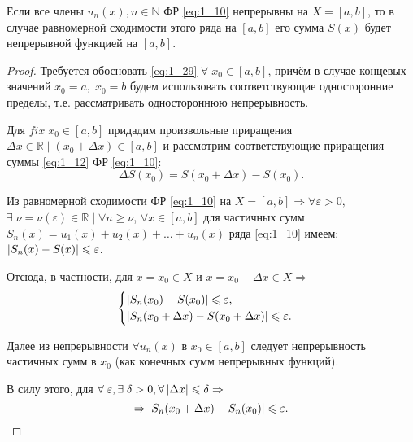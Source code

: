 \begin{theorem}
	Если все члены $u_n(x), n \in \mathbb{N}$ ФР \eqref{eq:1_10} непрерывны на $X = [a,b]$, то в случае равномерной сходимости этого ряда на $[a,b]$ его сумма $S(x)$ будет непрерывной функцией на $[a,b]$.
\end{theorem}
\begin{proof}
	Требуется обосновать  \eqref{eq:1_29} $\forall \; x_0 \in [a,b]$, причём в случае концевых значений $x_0 = a, \; x_0 = b$ будем использовать соответствующие односторонние пределы, т.е. рассматривать одностороннюю непрерывность.

	Для $fix \; x_0 \in [a,b]$ придадим произвольные приращения $\Delta x \in \mathbb{R} \; | \; (x_0 + \Delta x) \in [a,b]$ и рассмотрим соответствующие приращения суммы \eqref{eq:1_12} ФР \eqref{eq:1_10}:
    \begin{equation*}
        \Delta S(x_0) = S(x_0 + \Delta x) - S(x_0).
    \end{equation*}

    Из равномерной сходимости ФР \eqref{eq:1_10} на
    $X = [a,b] \Rightarrow \forall \varepsilon > 0, \;$
    ${ \exists \; \nu = \nu(\varepsilon) \in \mathbb{R} \; | \; \forall n \geqslant \nu }$,
    $ \forall x \in [a,b]$ для частичных сумм $S_n(x) = u_1(x) + u_2(x) + \ldots + u_n(x)$ ряда \eqref{eq:1_10} имеем: $\left\lvert S_n(x) - S(x) \right\rvert \leqslant \varepsilon$.

	Отсюда, в частности, для $x = x_0 \in X $ и $ x = x_0 + \Delta x \in X \Rightarrow$
	\begin{equation}
	\label{eq:1_30}
	\begin{cases}
	\left\lvert S_n(x_0) - S(x_0) \right\rvert \leqslant \varepsilon, \\
	\left\lvert S_n(x_0 + \Delta x) - S(x_0 + \Delta x) \right\rvert \leqslant \varepsilon.
	\end{cases}
	\end{equation}

	Далее из непрерывности $\forall u_n(x)$ в $x_0 \in [a,b]$ следует непрерывность частичных сумм в $x_0$ (как конечных сумм непрерывных функций).

	В силу этого, для $ \forall \; \varepsilon, \exists \; \delta > 0, \forall \left\lvert \Delta x \right\rvert \leqslant \delta \Rightarrow$
	\begin{equation}
    	\label{eq:1_31}
    	\Rightarrow \left\lvert S_n(x_0 + \Delta x) - S_n(x_0) \right\rvert \leqslant \varepsilon.
	\end{equation}


\end{proof}
